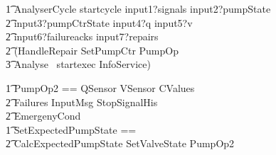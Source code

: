 \documentclass{report} %
\begin{document}
\begin{circusaction}
    \t1 AnalyserCycle \circdef startcycle \then input1?signals \then input2?pumpState \then \\
        \t2 input3?pumpCtrState \then input4?q \then input5?v \then \\
        \t2 input6?failureacks \then input7?repairs \then \\
        \t2 (\lschexpract HandleRepair \rschexpract \circseq \lschexpract SetPumpCtr \land PumpOp \rschexpract \circseq \\
            \t3 \lschexpract Analyse \rschexpract \circseq\ startexec \then InfoService) \\
\end{circusaction}
\begin{zed}
    \t1 PumpOp2 == \Xi QSensor \land \Xi VSensor \land \Xi CValues \land \\
        \t2 \Xi Failures \land \Xi InputMsg \land \Xi StopSignalHis \land \\
        \t2 \Xi EmergenyCond \\ %
    \t1 SetExpectedPumpState == \\
        \t2 CalcExpectedPumpState \land SetValveState \land PumpOp2 \\ %
\end{zed}
\end{document}
